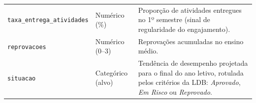 \begin{apendicesenv}
\begin{table}[htb]
\begin{tabular}{llp{6.4cm}}
\texttt{taxa\_entrega\_atividades} & Numérico (\%) & Proporção de atividades entregues no 1º semestre (sinal de regularidade do engajamento). \\
\texttt{reprovacoes} & Numérico (0--3) & Reprovações acumuladas no ensino médio. \\
\texttt{situacao} & Categórico (alvo) & Tendência de desempenho projetada para o final do ano letivo, rotulada pelos critérios da LDB: \textit{Aprovado}, \textit{Em Risco} ou \textit{Reprovado}. \\
\bottomrule
\end{tabular}
\end{table}

\end{apendicesenv}
